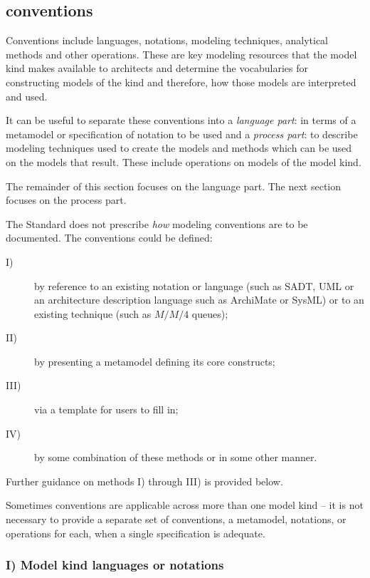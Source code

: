 \subsection{ conventions} 


Conventions include languages, notations, modeling techniques,
analytical methods and other operations. These are key modeling
resources that the model kind makes available to architects and
determine the vocabularies for constructing models of the kind and
therefore, how those models are interpreted and used.

It can be useful to separate these conventions into a \emph{language
  part}: in terms of a metamodel or specification of notation to be
used and a \emph{process part}: to describe modeling techniques used
to create the models and methods which can be used on the models that
result.  These include operations on models of the model kind.

The remainder of this section focuses on the language part. The next
section focuses on the process part.

The Standard does not prescribe \emph{how} modeling conventions are to
be documented.  The conventions could be defined:
\begin{description}
\item[I)] by reference to an existing notation or language (such as
  SADT, UML or an architecture description language such as ArchiMate
  or SysML) or to an existing technique (such as $M/M/4$ queues);
\item[II)] by presenting a metamodel defining its core constructs;
\item[III)] via a template for users to fill in;
\item[IV)] by some combination of these methods or in some other
  manner.
\end{description}

Further guidance on methods I) through III) is provided below.
 
Sometimes conventions are applicable across more than one model kind
-- it is not necessary to provide a separate set of conventions, a
metamodel, notations, or operations for each, when a single
specification is adequate.


\subsubsection{I) Model kind languages or notations \Optional}

